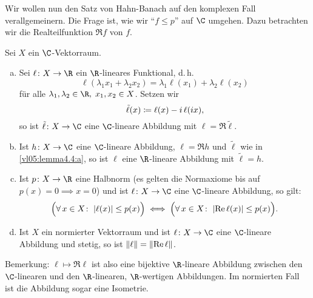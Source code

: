 Wir wollen nun den Satz von Hahn-Banach auf den komplexen Fall verallgemeinern.
Die Frage ist, wie wir \enquote{$f\leq p$\kern2pt} auf $\C$ umgehen. Dazu betrachten wir
die Realteilfunktion $\Re f$ von $f$.


\begin{thLemma} \label{vl05:lemma4.4}
    Sei $X$ ein $\C$-Vektorraum.
    \begin{enumerate}[(a)]
        \item \label{vl05:lemma4.4:a}
            Sei $\ell\colon X\to\R$ ein $\R$-lineares Funktional, d.\,h.
            \[ \ell(\lambda_1x_1+\lambda_2x_2) 
                = \lambda_1 \ell(x_1) + \lambda_2 \ell(x_2)
            \]
            für alle $\lambda_1,\lambda_2\in\R,\; x_1,x_2\in X$. Setzen wir
            \[ \tilde\ell(x) \coloneqq \ell(x) - i\,\ell(ix) , \]
            so ist $\tilde\ell\colon X\to\C$ eine $\C$-lineare Abbildung mit
            $\ell = \Re\tilde\ell$.
            
        \item \label{vl05:lemma4.4:b}
            Ist $h\colon X\to\C$ eine $\C$-lineare Abbildung, $\ell=\Re h$ und
            $\tilde\ell$ wie in \ref{vl05:lemma4.4:a},
            so ist $\ell$ eine $\R$-lineare Abbildung mit $\tilde\ell = h$.
            
        \item \label{vl05:lemma4.4:c}
            Ist $p\colon X\to\R$ eine Halbnorm (es gelten die Normaxiome bis auf
            $p(x)=0 \implies x=0$) und ist $\ell\colon X\to\C$ eine $\C$-lineare
            Abbildung, so gilt:
            \[ \Bigl( \forall\,x\in X\colon\; \lvert\ell(x)\rvert \leq p(x)  \Bigr)
                \iff
                \Bigl( \forall\,x\in X\colon\; \lvert\operatorname{Re}\ell(x)\rvert \leq p(x) \Bigr)
            . \]
            
        \item \label{vl05:lemma4.4:d}
            Ist $X$ ein normierter Vektorraum und ist $\ell\colon X\to\C$ eine
            $\C$-lineare Abbildung und stetig, so ist $\lVert\ell\rVert =
            \lVert\operatorname{Re}\ell\rVert$.
    \end{enumerate}
\end{thLemma}

Bemerkung: $\ell\mapsto\Re\ell$ ist also eine bijektive $\R$-lineare Abbildung
zwischen den $\C$-linearen und den $\R$-linearen, $\R$-wertigen Abbildungen.
Im normierten Fall ist die Abbildung sogar eine Isometrie.

